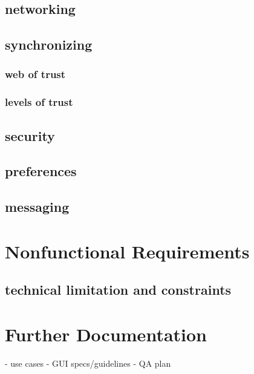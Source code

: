 \documentclass[english,a4paper,12pt]{report}
\begin{document}
\subsection{networking}
\subsection{synchronizing}
\subsubsection{web of trust}
\subsubsection{levels of trust}
\subsection{security}
\subsection{preferences}
\subsection{messaging}

\section{Nonfunctional Requirements}
\subsection{technical limitation and constraints}

\section{Further Documentation}
- use cases
- GUI specs/guidelines
- QA plan
\end{document}
